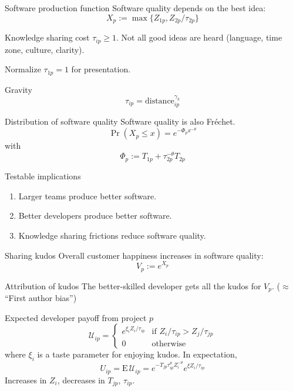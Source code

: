 \documentclass[
  ignorenonframetext,
  aspectratio=169,
]{beamer}
\providecommand{\tightlist}{%
  \setlength{\itemsep}{0pt}\setlength{\parskip}{0pt}}
\begin{document}
\begin{frame}{Software production function}
\protect\hypertarget{software-production-function}{}
Software quality depends on the best idea: \[
X_p := \max \{Z_{1p}, Z_{2p}/\tau_{2p}\}
\]

\begin{block}{Knowledge sharing cost}
\protect\hypertarget{knowledge-sharing-cost}{}
\(\tau_{ip} \ge 1\). Not all good ideas are heard (language, time zone,
culture, clarity).

Normalize \(\tau_{1p}=1\) for presentation.
\end{block}

\begin{block}{Gravity}
\protect\hypertarget{gravity}{}
\[
\tau_{ip} = \text{distance}_{ip}^{\gamma_k}
\]
\end{block}
\end{frame}

\begin{frame}{Distribution of software quality}
\protect\hypertarget{distribution-of-software-quality}{}
Software quality is also Fréchet. \[
\Pr(X_p \le x) = e^{-\Phi_p x^{-\theta}}
\] with \[
\Phi_p := T_{1p} + \tau_{2p}^{-\theta}T_{2p}
\]

\begin{block}{Testable implications}
\protect\hypertarget{testable-implications}{}
\begin{enumerate}
\tightlist
\item
  Larger teams produce better software.
\item
  Better developers produce better software.
\item
  Knowledge sharing frictions reduce software quality.
\end{enumerate}
\end{block}
\end{frame}

\begin{frame}{Sharing kudos}
\protect\hypertarget{sharing-kudos}{}
Overall customer happiness increases in software quality: \[
V_p := e^{X_p}
\]

\begin{block}{Attribution of kudos}
\protect\hypertarget{attribution-of-kudos}{}
The better-skilled developer gets all the kudos for \(V_p\).
(\(\approx\) ``First author bias'')
\end{block}
\end{frame}

\begin{frame}{Expected developer payoff from project \(p\)}
\protect\hypertarget{expected-developer-payoff-from-project-p}{}
\[
\mathcal U_{ip} = \begin{cases}
e^{\xi_i Z_i/\tau_{ip}} & \text{if }Z_i/\tau_{ip} > Z_j/\tau_{jp}\\
0 & \text{otherwise}
\end{cases}
\] where \(\xi_i\) is a taste parameter for enjoying kudos. In
expectation, \[
U_{ip} = \text{E}\,\mathcal U_{ip} =
e^{-T_{jp}\tau_{ip}^\theta Z_i^{-\theta}}
e^{\xi Z_i/\tau_{ip}}
\] Increases in \(Z_i\), decreases in \(T_{jp}\), \(\tau_{ip}\).
\end{frame}
\end{document}
